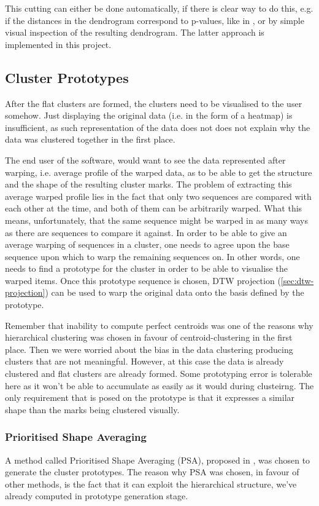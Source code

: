 \documentclass[parskip]{cs4rep}
\begin{document}
This cutting can either be done automatically, if there is clear way to do this, e.g. if the distances in the dendrogram correspond to p-values, like in \cite{Wang:2012cb}, or by simple visual inspection of the resulting dendrogram. The latter approach is implemented in this project.

\subsection{Cluster Prototypes}
\label{sec:prototypes}

After the flat clusters are formed, the clusters need to be visualised to the user somehow. Just displaying the original data (i.e. in the form of a heatmap) is insufficient, as such representation of the data does not does not explain why the data was clustered together in the first place. 

The end user of the software, would want to see the data represented after warping, i.e. average profile of the warped data, as to be able to get the structure and the shape of the resulting cluster marks. The problem of extracting this average warped profile lies in the fact that only two sequences are compared with each other at the time, and both of them can be arbitrarily warped. What this means, unfortunately, that the same sequence might be warped in as many ways as there are sequences to compare it against. In order to be able to give an average warping of sequences in a cluster, one needs to agree upon the base sequence upon which to warp the remaining sequences on. In other words,
one needs to find a prototype for the cluster in order to be able to visualise the warped items. Once this prototype sequence is chosen, DTW projection (\autoref{sec:dtw-projection}) can be used to warp the original data onto the basis defined by the prototype.

Remember that inability to compute perfect centroids was one of the reasons why hierarchical clustering was chosen in favour of centroid-clustering in the first place. Then we were worried about the bias in the data clustering producing clusters that are not meaningful. However, at this case the data is already clustered and flat clusters are already formed. Some prototyping error is tolerable here as it won't be able to accumulate as easily as it would during clusteirng. The only requirement that is posed on the prototype is that it expresses a similar shape than the marks being clustered visually.


\subsubsection{Prioritised Shape Averaging}
A method called Prioritised Shape Averaging (PSA), proposed in \cite{Niennattrakul:2009ep}, was chosen to generate the cluster prototypes. The reason why PSA was chosen, in favour of other methods, is the fact that it can exploit the hierarchical structure, we've already computed in prototype generation stage.
\end{document}
